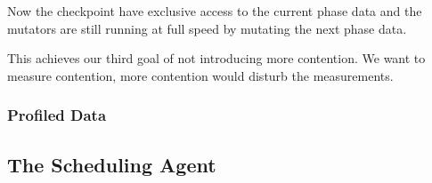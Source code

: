 Now the checkpoint have exclusive access to the current phase data and the mutators are still running at full speed by mutating the next phase data.

This achieves our third goal of not introducing more contention. We want to measure contention, more contention would disturb the measurements.

\subsubsection{Profiled Data} \label{sec:agentprof}


\subsection{The Scheduling Agent}


\fi


